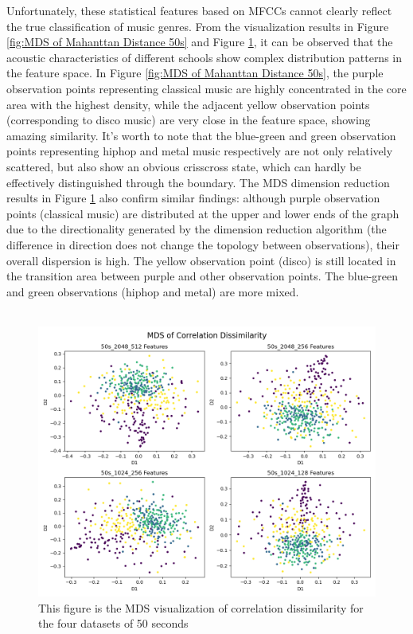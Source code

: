 \noindent Unfortunately, these statistical features based on MFCCs cannot clearly reflect the true classification of music genres. From the visualization results in Figure \ref{fig:MDS of Mahanttan Distance 50s} and Figure \ref{fig:MDS of Correlation Dissimilarity 50s}, it can be observed that the acoustic characteristics of different schools show complex distribution patterns in the feature space. In Figure \ref{fig:MDS of Mahanttan Distance 50s}, the purple observation points representing classical music are highly concentrated in the core area with the highest density, while the adjacent yellow observation points (corresponding to disco music) are very close in the feature space, showing amazing similarity. It's worth to note that the blue-green and green observation points representing hiphop and metal music respectively are not only relatively scattered, but also show an obvious crisscross state, which can hardly be effectively distinguished through the boundary. The MDS dimension reduction results in Figure \ref{fig:MDS of Correlation Dissimilarity 50s} also confirm similar findings: although purple observation points (classical music) are distributed at the upper and lower ends of the graph due to the directionality generated by the dimension reduction algorithm (the difference in direction does not change the topology between observations), their overall dispersion is high. The yellow observation point (disco) is still located in the transition area between purple and other observation points. The blue-green and green observations (hiphop and metal) are more mixed.\\
\\
\begin{figure}[h!]
	\centering
	\includegraphics[width=0.9\linewidth]{../Statistical_Sciences_template/figure/MDS of Correlation Dissimilarity 50s.png}
	\caption{This figure is the MDS visualization of correlation dissimilarity for the four datasets of 50 seconds}
	\label{fig:MDS of Correlation Dissimilarity 50s}
\end{figure}
